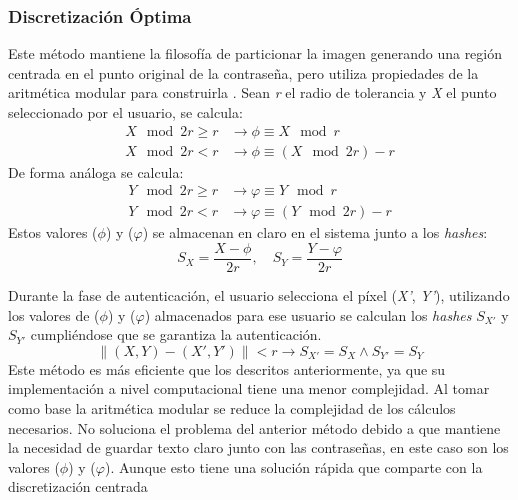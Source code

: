 \subsubsection{Discretización Óptima}
	
Este método mantiene la filosofía de particionar la imagen generando una región centrada en el punto original de la contraseña, pero utiliza propiedades de la aritmética modular para construirla \cite{bicakci2008optimal}. Sean \textit{r} el radio de tolerancia y \textit{X} el punto seleccionado por el usuario, se calcula:
\begin{equation}
	\begin{aligned}
		\textit{X} \mod{2r} \geq r &\rightarrow \phi \equiv X \mod{r} \\
		\textit{X} \mod{2r} < r &\rightarrow \phi \equiv (X \mod{2r}) - r
	\end{aligned}
	\label{eq:phi}
\end{equation}
De forma análoga se calcula:
\begin{equation}
	\begin{aligned}
		\textit{Y} \mod{2r} \geq r &\rightarrow \varphi \equiv Y \mod{r} \\
		\textit{Y} \mod{2r} < r &\rightarrow \varphi \equiv (Y \mod{2r}) - r
	\end{aligned}
	\label{eq:varphi}
\end{equation}
Estos valores (\(\phi\)) y (\(\varphi\)) se almacenan en claro en el sistema junto a los \textit{hashes}:
\begin{equation}
	S_X = \frac{X - \phi}{2r}, \quad S_Y = \frac{Y - \varphi}{2r} \label{eq:hashes}
\end{equation}

Durante la fase de autenticación, el usuario selecciona el píxel (\textit{X'}, \textit{Y'}), utilizando los valores de (\(\phi\)) y (\(\varphi\)) almacenados para ese usuario se calculan los \textit{hashes} \(S_{X'}\) y \(S_{Y'}\) cumpliéndose que se garantiza la autenticación.
\begin{equation}
	\|(X, Y) - (X', Y')\| < r \rightarrow S_{X'} = S_X \land S_{Y'} = S_Y \label{eq:autenticacion}
\end{equation}
Este método es más eficiente que los descritos anteriormente, ya que su implementación a nivel computacional tiene una menor complejidad. Al tomar como base la aritmética modular se reduce la complejidad de los cálculos necesarios. No soluciona el problema del anterior método debido a que mantiene la necesidad de guardar texto claro junto con  las  contraseñas,  en  este  caso  son  los  valores   ($\phi$)  y  ($\varphi$).  Aunque  esto tiene  una  solución  rápida  que comparte con la discretización centrada

